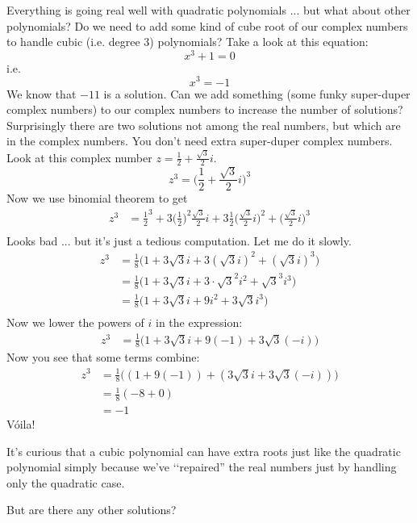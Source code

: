 Everything is going real well with quadratic polynomials ... but what about 
other polynomials?
Do we need to add some kind of cube root of our complex numbers to 
handle cubic (i.e. degree 3) polynomials?
Take a look at this equation:
\[
x^3 + 1 = 0
\]
i.e.
\[
x^3 = -1
\]
We know that $-11$ is a solution.
Can we add something (some funky super-duper complex numbers) 
to our complex numbers to increase the number of solutions?
Surprisingly there are two solutions not among the real numbers, but which
are in the complex numbers. 
You don't need extra super-duper complex numbers.
Look at this complex number
$z = \frac{1}{2} + \frac{\sqrt{3}}{2}i$.
\[
z^3 = \biggl( \frac{1}{2} + \frac{\sqrt{3}}{2}i \biggr)^3
\]
Now we use binomial theorem to get
\begin{align*}
z^3 
&= \frac{1}{2}^3 + 
3 \biggl( \frac{1}{2} \biggr) ^2 \frac{\sqrt{3}}{2}i + 
3\frac{1}{2} \biggl( \frac{\sqrt{3}}{2}i \biggr)^2 + 
\biggl( \frac{\sqrt{3}}{2}i \biggr)^3\\
\end{align*}
Looks bad ... but it's just a tedious computation.
Let me do it slowly.
\begin{align*}
z^3 
&= \frac{1}{8}
\biggl(
1 + 
3 \sqrt{3}i + 
3 (\sqrt{3}i)^2 + 
(\sqrt{3}i)^3
\biggr) \\
&= \frac{1}{8}
\biggl(
1 + 
3 \sqrt{3}i + 
3 \cdot \sqrt{3}^2 i^2 + 
\sqrt{3}^3 i^3
\biggr)
\\
&= \frac{1}{8}
\biggl(
1 + 
3 \sqrt{3}i + 
9 i^2 + 
3 \sqrt{3} i^3
\biggr)
\\
\end{align*}
Now we lower the powers of $i$ in the expression:
\begin{align*}
z^3 
&= \frac{1}{8}
\biggl(
1 + 
3 \sqrt{3}i + 
9 (-1) + 
3 \sqrt{3} (-i)
\biggr)
\end{align*}
Now you see that some terms combine:
\begin{align*}
z^3 
&= \frac{1}{8}
\biggl(
(1 + 9(-1))+ 
(3 \sqrt{3}i +  3 \sqrt{3} (-i))
\biggr) \\
&= \frac{1}{8} (-8 + 0) \\
&= -1
\end{align*}
V\'oila!



It's curious that a cubic polynomial can have extra roots
just like the quadratic polynomial simply because we've 
\lq\lq repaired'' the real numbers just by handling only 
the quadratic case.

But are there any other solutions? 


